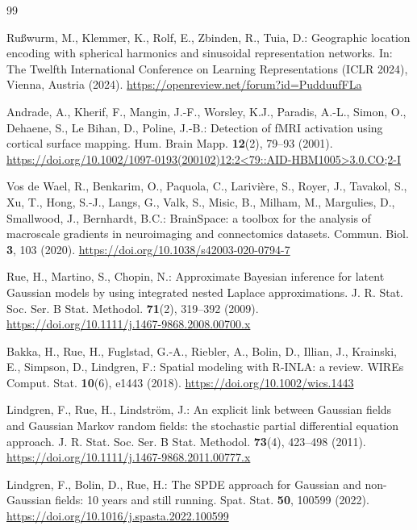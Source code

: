\documentclass[pdflatex,sn-mathphys,Numbered]{sn-jnl}
\theoremstyle{thmstyleone}%
\theoremstyle{thmstyletwo}%
\theoremstyle{thmstylethree}%
\begin{document}
\begin{thebibliography}{99}

Ru\ss wurm, M., Klemmer, K., Rolf, E., Zbinden, R., Tuia, D.: Geographic
location encoding with spherical harmonics and sinusoidal representation
networks. In: The Twelfth International Conference on Learning Representations
(ICLR 2024), Vienna, Austria (2024).
\url{https://openreview.net/forum?id=PudduufFLa}

Andrade, A., Kherif, F., Mangin, J.-F., Worsley, K.J., Paradis, A.-L.,
Simon, O., Dehaene, S., Le Bihan, D., Poline, J.-B.: Detection of fMRI
activation using cortical surface mapping. Hum. Brain Mapp. \textbf{12}(2),
79--93 (2001).
\href{https://doi.org/10.1002/1097-0193(200102)12:2<79::AID-HBM1005>3.0.CO;2-I}{https://doi.org/10.1002/1097-0193(200102)12:2\textless 79::AID-HBM1005\textgreater 3.0.CO;2-I}

Vos de Wael, R., Benkarim, O., Paquola, C., Larivi\`ere, S., Royer, J.,
Tavakol, S., Xu, T., Hong, S.-J., Langs, G., Valk, S., Misic, B., Milham, M.,
Margulies, D., Smallwood, J., Bernhardt, B.C.: BrainSpace: a toolbox for the
analysis of macroscale gradients in neuroimaging and connectomics datasets.
Commun. Biol. \textbf{3}, 103 (2020).
\url{https://doi.org/10.1038/s42003-020-0794-7}

Rue, H., Martino, S., Chopin, N.: Approximate Bayesian inference for latent
Gaussian models by using integrated nested Laplace approximations. J. R. Stat.
Soc. Ser. B Stat. Methodol. \textbf{71}(2), 319--392 (2009).
\url{https://doi.org/10.1111/j.1467-9868.2008.00700.x}

Bakka, H., Rue, H., Fuglstad, G.-A., Riebler, A., Bolin, D., Illian, J.,
Krainski, E., Simpson, D., Lindgren, F.: Spatial modeling with R-INLA: a
review. WIREs Comput. Stat. \textbf{10}(6), e1443 (2018).
\url{https://doi.org/10.1002/wics.1443}

Lindgren, F., Rue, H., Lindstr\"om, J.: An explicit link between Gaussian
fields and Gaussian Markov random fields: the stochastic partial differential
equation approach. J. R. Stat. Soc. Ser. B Stat. Methodol. \textbf{73}(4),
423--498 (2011). \url{https://doi.org/10.1111/j.1467-9868.2011.00777.x}

Lindgren, F., Bolin, D., Rue, H.: The SPDE approach for Gaussian and
non-Gaussian fields: 10 years and still running. Spat. Stat. \textbf{50},
100599 (2022). \url{https://doi.org/10.1016/j.spasta.2022.100599}


\end{thebibliography}
\end{document}
